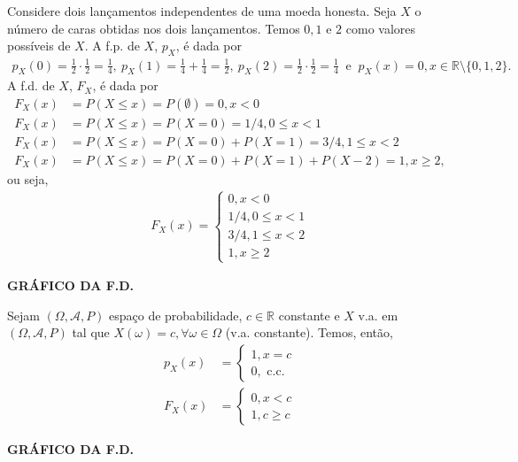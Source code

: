 \documentclass[../Notas.tex]{subfiles}
\begin{document}
\begin{example}
Considere dois lançamentos independentes de uma moeda honesta. Seja $X$ o número de caras obtidas nos dois lançamentos. Temos $0, 1$ e $2$ como valores possíveis de $X$. A f.p. de $X$, $p_X$, é dada por
\begin{align*}
    p_X(0) = \frac{1}{2}\cdot\frac{1}{2} = \frac{1}{4}, \ p_X(1) = \frac{1}{4} + \frac{1}{4} = \frac{1}{2}, \ p_X(2) = \frac{1}{2}\cdot\frac{1}{2} = \frac{1}{4} \ \text{ e } \ p_X(x) = 0, x\in\mathbb{R}\setminus\{0, 1, 2\}.
\end{align*}
A f.d. de $X$, $F_X$, é dada por
\begin{align*}
    F_X(x) &= P(X\leq x) = P(\emptyset) = 0, x < 0 \\
    F_X(x) &= P(X\leq x) = P(X=0) = 1/4, 0\leq x < 1 \\
    F_X(x) &= P(X\leq x) = P(X=0) + P(X=1) = 3/4, 1\leq x < 2 \\
    F_X(x) &= P(X\leq x) = P(X=0) + P(X=1) + P(X-2) = 1, x\geq 2,
\end{align*}
ou seja, 
\begin{align*}
    F_X(x) = \begin{cases}
    0, x<0 \\
    1/4, 0\leq x < 1 \\
    3/4, 1\leq x < 2 \\
    1, x\geq 2
    \end{cases}
\end{align*}
\begin{center}
    \textbf{GRÁFICO DA F.D.}
\end{center}
\end{example}

\begin{example}
Sejam $(\Omega, \mathcal{A}, P)$ espaço de probabilidade, $c\in\mathbb{R}$ constante e $X$ v.a. em $(\Omega, \mathcal{A}, P)$ tal que $X(\omega) = c, \forall \omega\in\Omega$ (v.a. constante). Temos, então,
\begin{align*}
    p_X(x) &= \begin{cases}
    1, x = c \\
    0, \text{ c.c.}
    \end{cases} \\
    F_X(x) &= \begin{cases}
    0, x < c \\
    1, c\geq c
    \end{cases}
\end{align*}
\begin{center}
    \textbf{GRÁFICO DA F.D.}
\end{center}
\end{example}
\end{document}
